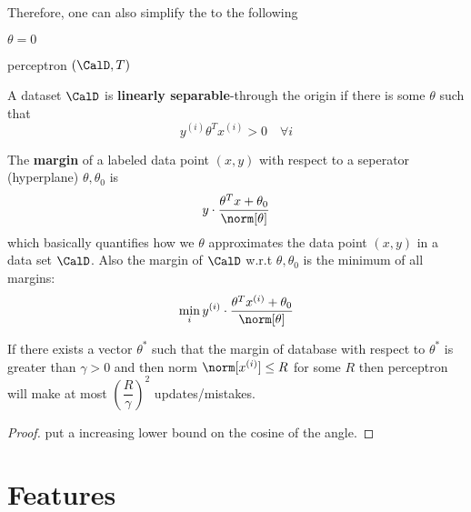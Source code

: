 Therefore, one can also simplify the  to the following

\begin{algorithm}[H]
    \DontPrintSemicolon
    $\theta = 0 $\;

    \Return{$\theta $}
    \caption{ perceptron $(\CalD , T )$}
\end{algorithm}
A dataset \(\CalD\) is \textbf{linearly separable}-through the origin if there is some \(\theta\) such that
\begin{equation*}
    y^{(i)} \theta^T x^{(i)} > 0 \quad \forall i
\end{equation*}

The \textbf{margin} of a labeled data point \((x,y)\) with respect to a seperator (hyperplane) \(\theta, \theta_0\) is
\begin{equation*}
    y \cdot \dfrac{\theta^T x +  \theta_0}{\norm[\theta]}
\end{equation*}
which basically quantifies how we \(\theta\) approximates the data point \((x,y)\) in a data set \(\CalD\). Also the margin of \(\CalD\) w.r.t \(\theta, \theta_0\) is
the minimum of all margins:
\begin{equation*}
    \min_i     y^{(i)} \cdot \dfrac{\theta^T x^{(i)} + \theta_0}{\norm[\theta]}
\end{equation*}

\begin{theorem} 
    If there exists a vector \(\theta^\ast\) such that the margin of database with respect to \(\theta^\ast\) is greater than \(\gamma > 0\) and then norm \(\norm[x^{(i)}] \leq R\) for some \(R\) then perceptron will make at most \(\left(\dfrac{R}{\gamma} \right)^2\) updates/mistakes.
\end{theorem}

\begin{proof}
    put a increasing lower bound on the cosine of the angle.
\end{proof}

\section{Features}
